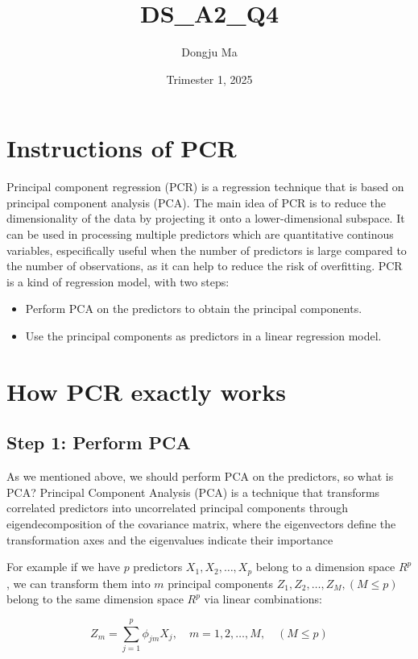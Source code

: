 \documentclass{article}
\title{DS\_A2\_Q4}
\author{Dongju Ma}
\date{Trimester 1, 2025}
\begin{document}
\maketitle

\section{Instructions of PCR}
Principal component regression (PCR) is a regression technique that is based on principal component analysis (PCA). 
The main idea of PCR is to reduce the dimensionality of the data by projecting it onto a lower-dimensional subspace. 
It can be used in processing multiple predictors which are quantitative continous variables, especifically useful when the number of predictors is large compared to the number of observations, as it can help to reduce the risk of overfitting.
PCR is a kind of regression model, with two steps: 
\begin{itemize}
    \item Perform PCA on the predictors to obtain the principal components.
    \item Use the principal components as predictors in a linear regression model.
\end{itemize}


\section{How PCR exactly works}

\subsection{Step 1: Perform PCA}
As we mentioned above, we should perform PCA on the predictors, so what is PCA?
Principal Component Analysis (PCA) is a technique that transforms correlated predictors into uncorrelated principal components through eigendecomposition of the covariance matrix, where the eigenvectors define the transformation axes and the eigenvalues indicate their importance 

For example if we have \(p\) predictors \(X_1, X_2, \dots, X_p\) belong to a dimension space \(R^p\), we can transform them into \(m\) principal components \(Z_1, Z_2, \dots, Z_M, (M \leq p)\) belong to the same dimension space \(R^p\) via linear combinations:

\begin{equation}
    Z_m = \sum_{j=1}^{p} \phi_{jm} {X}_j, \quad m = 1, 2, \dots, M, \quad (M \leq p)
\end{equation}
\end{document}
